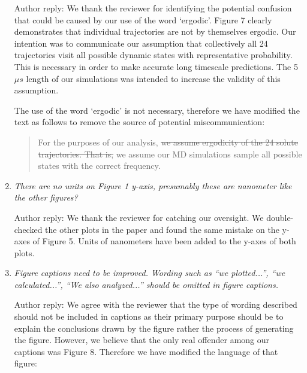 \documentclass{article}
\begin{document}
\begin{enumerate}[label={Comment \theenumi :}, leftmargin=3.9\parindent]
    Author reply: We thank the reviewer for identifying the potential confusion that could be
    caused by our use of the word `ergodic'. Figure 7 clearly demonstrates that individual trajectories
    are not by themselves ergodic. Our intention was to communicate our assumption that collectively all 24 
    trajectories visit all possible dynamic states with representative probability. This is 
    necessary in order to make accurate long timescale predictions. The 5 $\mu s$ length of our 
    simulations was intended to increase the validity of this assumption. 
    
    The use of the word `ergodic' is not necessary, therefore we have modified the text as follows
    to remove the source of potential miscommunication:
    
    \begin{quote}
    For the purposes of our analysis, \sout{we assume ergodicity of the 24 solute trajectories. That is,}
    we assume our MD simulations sample all possible states with the correct frequency.
    \end{quote}    
    
    \item \textit{There are no units on Figure 1 y-axis, presumably these are nanometer like the 
    other figures?}
    
    Author reply: We thank the reviewer for catching our oversight. We double-checked the 
    other plots in the paper and found the same mistake on the y-axes of Figure 5. Units of nanometers
    have been added to the y-axes of both plots.
    
    \item \textit{Figure captions need to be improved. Wording such as “we plotted...”, “we 
    calculated...”, “We also analyzed...” should be omitted in figure captions.}  
    
    Author reply: We agree with the reviewer that the type of wording described should not be
    included in captions as their primary purpose should be to explain the conclusions drawn
    by the figure rather the process of generating the figure. However, we believe that the 
    only real offender among our captions was Figure 8. Therefore we have modified the language
    of that figure:
    

\end{enumerate}
\end{document}
